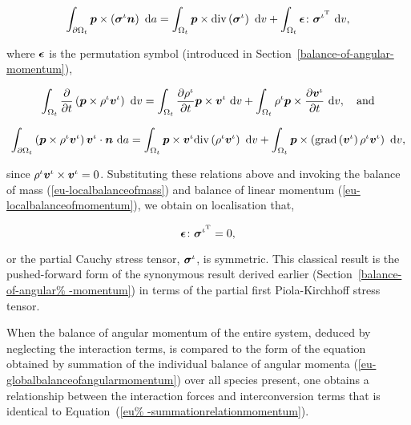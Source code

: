 \begin{displaymath}
\int_{\partial \Omega_{t}} \mbox{\boldmath$ p$} \times
\left(\mbox{\boldmath$\sigma$}^{\iota}\mbox{\boldmath$ n$}\right)\ \mathrm{d}a = \int_{\Omega_{t}}
\mbox{\boldmath$ p$} \times \mathrm{div}\left(\mbox{\boldmath$\sigma$}^{\iota}\right)\ \mathrm{d}v
+\int_{\Omega_{t}} \mbox{\boldmath$\epsilon$}\colon\mbox{\boldmath$\sigma$}^{\iota^{\mathrm{T}}}
\ \mathrm{d}v,
\end{displaymath}

\noindent where $\mbox{\boldmath$\epsilon$}$ is the permutation symbol (introduced in
Section~\ref{balance-of-angular-momentum}),

\begin{displaymath}
\int_{\Omega_{t}} \frac{\partial}{\partial t}\left( \mbox{\boldmath$ p$} \times
\rho^{\iota} \mbox{\boldmath$ v$}^{\iota}\right)\ \mathrm{d}v = \int_{\Omega_{t}}
\frac{\partial \rho^{\iota}} {\partial t} \mbox{\boldmath$ p$} \times
\mbox{\boldmath$ v$}^{\iota}\ \mathrm{d}v + \int_{\Omega_{t}} \rho^{\iota} \mbox{\boldmath$ p$} \times
\frac{\partial \mbox{\boldmath$ v$}^{\iota}} {\partial
  t}\ \mathrm{d}v,\quad\mathrm{and}
\end{displaymath}

\begin{displaymath}
\int_{\partial \Omega_{t}} \left(\mbox{\boldmath$ p$} \times \rho^{\iota}
\mbox{\boldmath$ v$}^{\iota}\right) \mbox{\boldmath$ v$}^{\iota} \cdot \mbox{\boldmath$ n$}\ \mathrm{d}a =
\int_{\Omega_{t}}\mbox{\boldmath$ p$} \times \mbox{\boldmath$ v$}^{\iota} \mathrm{div}
\left(\rho^{\iota}\mbox{\boldmath$ v$}^{\iota}\right)\ \mathrm{d}v +
\int_{\Omega_{t}}\mbox{\boldmath$ p$} \times
\left(\mathrm{grad}\left(\mbox{\boldmath$ v$}^{\iota}\right)
\rho^{\iota}\mbox{\boldmath$ v$}^{\iota}\right)\ \mathrm{d}v,
\end{displaymath}

\noindent since $\rho^{\iota} \mbox{\boldmath$ v$}^{\iota}\times\mbox{\boldmath$ v$}^{\iota} =
0$. Substituting these relations above and invoking the balance of
mass (\ref{eu-localbalanceofmass}) and balance of linear momentum
(\ref{eu-localbalanceofmomentum}), we obtain on localisation that,

\begin{equation}
\mbox{\boldmath$\epsilon$}\colon\mbox{\boldmath$\sigma$}^{\iota^{\mathrm{T}}} = 0,
\label{eu-localbalanceofangularmomentum}
\end{equation}

\noindent or the partial Cauchy stress tensor, $\mbox{\boldmath$\sigma$}^{\iota}$, is
symmetric. This classical result is the pushed-forward form of the
synonymous result derived earlier (Section~\ref{balance-of-angular%
  -momentum}) in terms of the partial first Piola-Kirchhoff stress
tensor.

When the balance of angular momentum of the entire system, deduced by
neglecting the interaction terms, is compared to the form of the
equation obtained by summation of the individual balance of angular
momenta (\ref{eu-globalbalanceofangularmomentum}) over all species
present, one obtains a relationship between the interaction forces and
interconversion terms that is identical to Equation~(\ref{eu%
  -summationrelationmomentum}).

